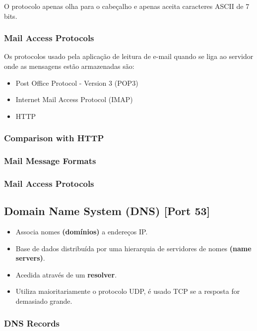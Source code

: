 \documentclass[12pt]{article}
\begin{document}
O protocolo apenas olha para o cabeçalho e apenas aceita caracteres ASCII de 7 bits.

\subsubsection{Mail Access Protocols}

Os protocolos usado pela aplicação de leitura de e-mail quando se liga ao servidor onde as mensagens estão armazenadas são:

\begin{itemize}
    \item Post Office Protocol - Version 3 (POP3)
    \item Internet Mail Access Protocol (IMAP)
    \item HTTP
\end{itemize}

\subsubsection{Comparison with HTTP}

\subsubsection{Mail Message Formats}

\subsubsection{Mail Access Protocols}

\subsection{Domain Name System (DNS) [Port 53]}

\begin{itemize}
    \item Associa nomes \textbf{(domínios)} a endereços IP.
    \item Base de dados distribuída por uma hierarquia de servidores de nomes \textbf{(name servers)}.
    \item Acedida através de um \textbf{resolver}.
    \item Utiliza maioritariamente o protocolo UDP, é usado TCP se a resposta for demasiado grande.
\end{itemize}

\subsubsection{DNS Records}
\end{document}
